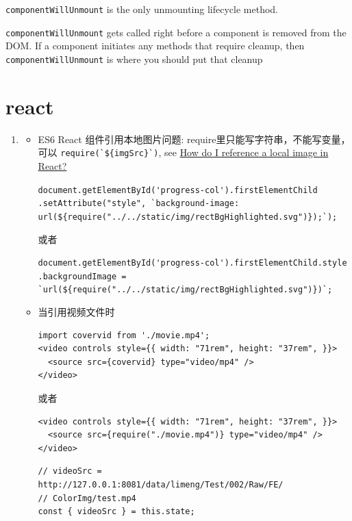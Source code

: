 \documentclass[a4paper, 12pt]{article}
\begin{document}
\verb|componentWillUnmount| is the only unmounting lifecycle method.

\verb|componentWillUnmount| gets called right before a component is removed from the DOM. If a component initiates any methods that require cleanup, then \verb|componentWillUnmount| is where you should put that cleanup


\section{react}
\begin{enumerate}
\item 
\begin{itemize}
\item ES6 React 组件引用本地图片问题: require里只能写字符串，不能写变量，可以 \verb|require(`${imgSrc}`)|, see \href{https://stackoverflow.com/questions/39999367/how-do-i-reference-a-local-image-in-react}{How do I reference a local image in React?}

\verb|document.getElementById('progress-col').firstElementChild|\newline
\verb|.setAttribute("style", `background-image:|\newline
\verb| url(${require("../../static/img/rectBgHighlighted.svg")});`);|

或者

\verb|document.getElementById('progress-col').firstElementChild.style|\newline
\verb|.backgroundImage = `url(${require("../../static/img/rectBgHighlighted.svg")})`;|


\item 当引用视频文件时
\begin{verbatim}
import covervid from './movie.mp4';
<video controls style={{ width: "71rem", height: "37rem", }}>
  <source src={covervid} type="video/mp4" />
</video>
\end{verbatim}
或者
\begin{verbatim}
<video controls style={{ width: "71rem", height: "37rem", }}>
  <source src={require("./movie.mp4")} type="video/mp4" />
</video>
\end{verbatim}

\vspace{1in}
\begin{verbatim}
// videoSrc = http://127.0.0.1:8081/data/limeng/Test/002/Raw/FE/
// ColorImg/test.mp4
const { videoSrc } = this.state;


\end{verbatim}
\end{itemize}
\end{enumerate}
\end{document}
